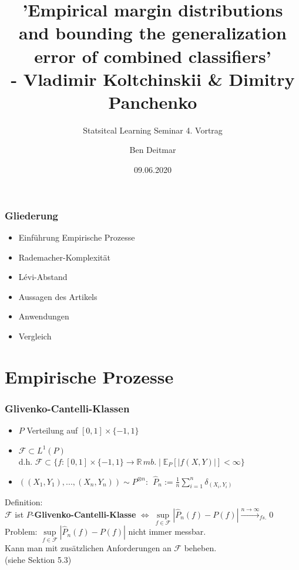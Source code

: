 \documentclass{beamer}
\title[Koltchinskii \& Panchenko]{'Empirical margin distributions and bounding the generalization error of combined classifiers' \\ - Vladimir Koltchinskii \& Dimitry Panchenko}
\subtitle{Statsitcal Learning Seminar 4. Vortrag}
\author[Statistical Learning Seminar]{Ben Deitmar}
\date{09.06.2020}
\newcommand{\R}{\mathbb{R}} %
\newcommand{\E}{\mathbb{E}} %
\newcommand{\F}{\mathcal{F}}
\begin{document}
	
	\begin{frame}
		\titlepage
	\end{frame}
	
	\begin{frame}
		\frametitle{Gliederung}
		\begin{itemize}
			\item Einführung Empirische Prozesse
			\item Rademacher-Komplexität
			\item L\'evi-Abstand
			\item Aussagen des Artikels
			\item Anwendungen
			\item Vergleich
		\end{itemize}
	\end{frame}


	\section{Empirische Prozesse}
	
	\begin{frame}
		\frametitle{Glivenko-Cantelli-Klassen}
		\begin{itemize}
			\item $P$ Verteilung auf $[0,1]\times\{-1,1\}$
			\item $\F \subset L^1(P)$\\
			d.h. $\F \subset \{ f : [0,1] \times \{-1,1\} \rightarrow \R \, mb. \mid \E_P[|f(X,Y)|]<\infty \}$
			\item $((X_1,Y_1),...,(X_n,Y_n)) \sim P^{\otimes n} : \ \ \hat{P}_n := \frac{1}{n} \sum\limits_{i=1}^n \delta_{(X_i,Y_i)}$
		\end{itemize}
		\hfill\break
		Definition:\\
		$\F$ ist $P$-\textbf{Glivenko-Cantelli-Klasse} $\Leftrightarrow \ \sup\limits_{f \in \F} \left| \hat{P}_n(f) - P(f) \right| \xrightarrow{n \rightarrow \infty}_{fs.} 0$
		\hfill\break
		\hfill\break
		\pause
		Problem: $\sup\limits_{f \in \F} \left| \hat{P}_n(f) - P(f) \right|$ nicht immer messbar.\\
		Kann man mit zusätzlichen Anforderungen an $\F$ beheben.\\ (siehe \cite{DudleyUCLT} Sektion 5.3)
	\end{frame}
\end{document}
